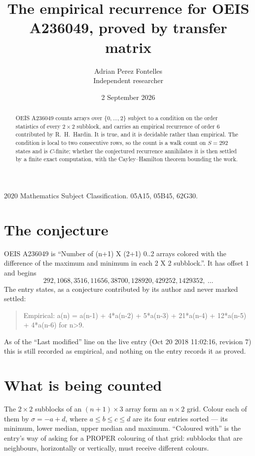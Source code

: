 \documentclass[11pt,a4paper]{article}
\title{The empirical recurrence for OEIS A236049, proved by transfer matrix}
\author{Adrian Perez Fontelles\\ \small Independent researcher}
\date{2 September 2026}
\theoremstyle{plain}
\theoremstyle{definition}
\begin{document}
\maketitle

\begin{abstract}
OEIS A236049 counts arrays over $\{0,\dots,2\}$ subject to a condition on the order
statistics of every $2\times2$ subblock, and carries an empirical recurrence of order
$6$ contributed by R.~H.~Hardin. It is true, and it is decidable rather than empirical.
The condition is local to two consecutive rows, so the count is a walk count on $S=292$
states and is $C$-finite; whether the conjectured recurrence annihilates it is then settled by
a finite exact computation, with the Cayley--Hamilton theorem bounding the work.
\end{abstract}

\noindent\small 2020 Mathematics Subject Classification. 05A15, 05B45, 62G30.\normalsize

\section{The conjecture}

OEIS A236049 is ``Number of (n+1) X (2+1) 0..2 arrays colored with the difference of the maximum and minimum in each 2 X 2 subblock.''. It has offset $1$ and begins
\[
292, 1068, 3516, 11656, 38700, 128920, 429252, 1429352,\ \dots
\]
The entry states, as a conjecture contributed by its author and never marked settled:
\begin{quote}
Empirical: a(n) = a(n-1) + 4*a(n-2) + 5*a(n-3) + 21*a(n-4) + 12*a(n-5) + 4*a(n-6) for n>9.
\end{quote}
As of the ``Last modified'' line on the live entry (Oct 20 2018 11:02:16, revision 7) this is still
recorded as empirical, and nothing on the entry records it as proved.

\section{What is being counted}

The $2\times2$ subblocks of an $(n+1)\times3$ array form an
$n\times2$ grid. Colour each of them by $\sigma=-a+d$, where $a\le b\le c\le d$ are its four entries sorted --- its minimum, lower median, upper median and maximum. ``Coloured with'' is the entry's way of
asking for a PROPER colouring of that grid: subblocks that are neighbours, horizontally or
vertically, must receive different colours.
\end{document}
